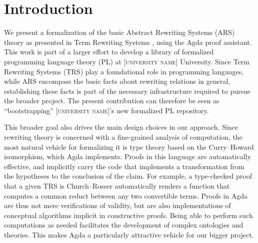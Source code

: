\section{Introduction}

\newcommand{\inreview}[1]{[\textsc{university name}]}

\label{sec:Introduction}

%


We present a formalization of the basic Abstract Rewriting Systems (ARS) theory as presented in Term Rewriting Systems
 \cite{Terese}, using the Agda proof assistant.
This work is part of a larger effort to develop a library of formalized programming language theory (PL)
at \inreview{Appalachian State} University.
Since Term Rewriting Systems (TRS) play a foundational role in programming languages,
while ARS encompass the basic facts about rewriting relations in general,
establishing these facts is part of the necessary infrastructure required to
pursue the broader project.  The present contribution can therefore be seen as
``bootstrapping'' \inreview{Appalachian State}'s new formalized PL repository.

This broader goal also drives the main design choices in our approach.
Since rewriting theory is concerned with a fine-grained analysis of computation,
the most natural vehicle for formalizing it is type theory based on the
Curry--Howard isomorphism, which Agda implements.  Proofs in this language
are automatically effective, and implicitly carry the code that implements
a transformation from the hypotheses to the conclusion of the claim.  For example,
a type-checked proof that a given TRS is Church--Rosser automatically renders a function that
computes a common reduct between any two convertible terms.
Proofs in Agda are thus not mere verifications of validity, but are also implementations
of conceptual algorithms implicit in constructive proofs.
Being able to perform such computations as needed
facilitates the development of complex ontologies and theories.
This makes Agda a particularly attractive vehicle for our bigger project.

